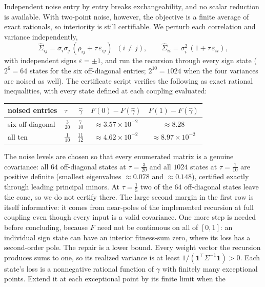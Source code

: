 \documentclass[11pt]{article}
\theoremstyle{remark}
\begin{document}
Independent noise entry by entry breaks exchangeability, and no scalar
reduction is available. With two-point noise, however, the objective is a
finite average of exact rationals, so interiority is still certifiable.
We perturb each correlation and variance independently,
\[
  \widehat\Sigma_{ij} = \sigma_i\sigma_j\,(\rho_{ij} + \tau\,
  \varepsilon_{ij}) \;\; (i \ne j),
  \qquad
  \widehat\Sigma_{ii} = \sigma_i^2\,(1 + \tau\,\varepsilon_{ii}),
\]
with independent signs $\varepsilon = \pm 1$, and run the recursion
through every sign state ($2^6 = 64$ states for the six off-diagonal
entries; $2^{10} = 1024$ when the four variances are noised as well). The
certificate script verifies the following as exact rational inequalities,
with every state defined at each coupling evaluated:
\begin{center}
\begin{tabular}{llccc}
\toprule
noised entries & $\tau$ & $\hat\gamma$ &
$F(0) - F(\hat\gamma)$ & $F(1) - F(\hat\gamma)$ \\
\midrule
six off-diagonal & $\tfrac{3}{20}$ & $\tfrac{7}{10}$ &
$\approx 3.57 \times 10^{-2}$ & $\approx 8.28$ \\
all ten & $\tfrac1{10}$ & $\tfrac{11}{12}$ &
$\approx 4.62 \times 10^{-2}$ & $\approx 8.97 \times 10^{-2}$ \\
\bottomrule
\end{tabular}
\end{center}
The noise levels are chosen so that every enumerated matrix is a genuine
covariance: all $64$ off-diagonal states at $\tau = \tfrac{3}{20}$ and
all $1024$ states at $\tau = \tfrac{1}{10}$ are positive definite
(smallest eigenvalues $\approx 0.078$ and $\approx 0.148$), certified
exactly through leading principal minors. At $\tau = \tfrac15$ two of
the $64$ off-diagonal states leave the cone, so we do not certify
there. The large second margin in the first row is itself informative:
it comes from near-poles of the implemented recursion at full coupling
even though every input is a valid covariance.
One more step is needed before concluding, because $F$ need not be
continuous on all of $[0,1]$: an individual sign state can have an
interior fitness-sum zero, where its loss has a second-order pole. The
repair is a lower bound. Every weight vector the recursion produces sums
to one, so its realized variance is at least
$1/(\mathbf{1}^\top\Sigma^{-1}\mathbf{1}) > 0$. Each state's loss is a
nonnegative rational function of $\gamma$ with finitely many exceptional
points. Extend it at each exceptional point by its finite limit when the
\end{document}
